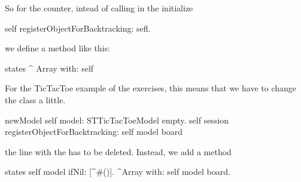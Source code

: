 \documentclass[a4paper,10pt,twoside]{book}
\begin{document}
So for the counter, intead of calling in the initialize

\begin{code}
	self registerObjectForBacktracking: sefl.
\end{code}

we define a method  like this:

\begin{code}
states
	^ Array with: self
\end{code}


For the TicTacToe example of the exercises, this means that we have to change
the class  a little.

\begin{code}
newModel
	self model: STTicTacToeModel empty.
	self session registerObjectForBacktracking: self model board
\end{code}

the line with the  has to be deleted. Instead, we add a method 

\begin{code}
states
	self model ifNil: [^#()].
	^Array with: self model board.
\end{code}




\ifx\wholebook\relax\else 
   
   
\end{document}
